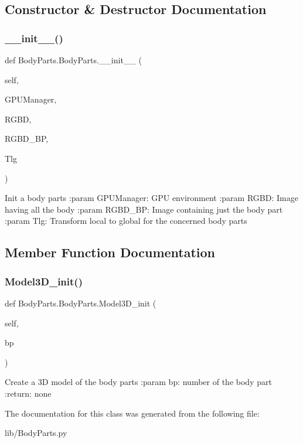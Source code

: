 \subsection{Constructor \& Destructor Documentation}
\mbox{\label{class_body_parts_1_1_body_parts_a1d480c13f6791c93e0da18d6da99a785}} 
\subsubsection{\+\_\+\+\_\+init\+\_\+\+\_\+()}
{\footnotesize\ttfamily def Body\+Parts.\+Body\+Parts.\+\_\+\+\_\+init\+\_\+\+\_\+ (\begin{DoxyParamCaption}\item[{}]{self,  }\item[{}]{G\+P\+U\+Manager,  }\item[{}]{R\+G\+BD,  }\item[{}]{R\+G\+B\+D\+\_\+\+BP,  }\item[{}]{Tlg }\end{DoxyParamCaption})}

\begin{DoxyVerb}Init a body parts
:param GPUManager: GPU environment
:param RGBD: Image having all the body
:param RGBD_BP: Image containing just the body part
:param Tlg: Transform local to global for the concerned body parts
\end{DoxyVerb}
 

\subsection{Member Function Documentation}
\mbox{\label{class_body_parts_1_1_body_parts_a42e88badcb71b203213ef853ff7aa291}} 
\subsubsection{Model3\+D\+\_\+init()}
{\footnotesize\ttfamily def Body\+Parts.\+Body\+Parts.\+Model3\+D\+\_\+init (\begin{DoxyParamCaption}\item[{}]{self,  }\item[{}]{bp }\end{DoxyParamCaption})}

\begin{DoxyVerb}Create a 3D model of the body parts
:param bp: number of the body part
:return:  none
\end{DoxyVerb}
 

The documentation for this class was generated from the following file\+:\begin{DoxyCompactItemize}
\item 
lib/Body\+Parts.\+py\end{DoxyCompactItemize}
